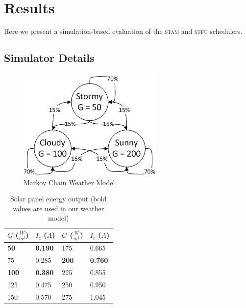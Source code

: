 \section{Results} \label{sec:simulation}

Here we present a simulation-based evaluation of the \textsc{stam} and \textsc{stfu} schedulers. 

\subsection{Simulator Details }

\begin{figure}[htb]
\begin{center}
\caption{Markov Chain Weather Model.\label{fig:markov}}
\includegraphics[scale=0.8]{markov.png}
\end{center}
\end{figure}
\begin{table}[h]
\begin{center}

\begin{tabular}{| l | l || l | l |}
\hline
\textbf{$G$ ($\frac{W}{m^2}$)} & \textbf{$I_c$ ($A$)} & \textbf{$G$ ($\frac{W}{m^2}$)} & \textbf{$I_c$ ($A$)} \\
\hline
\textbf{50} & \textbf{0.190} & 175 & 0.665 \\
75 & 0.285 & \textbf{200} & \textbf{0.760} \\
\textbf{100} & \textbf{0.380} & 225 & 0.855 \\
125 & 0.475 & 250 & 0.950 \\
150 & 0.570 & 275 & 1.045 \\
\hline
\end{tabular}
\end{center}
\caption{Solar panel energy output (bold values are used in our weather model)\label{tab:radiance}}
\end{table}

